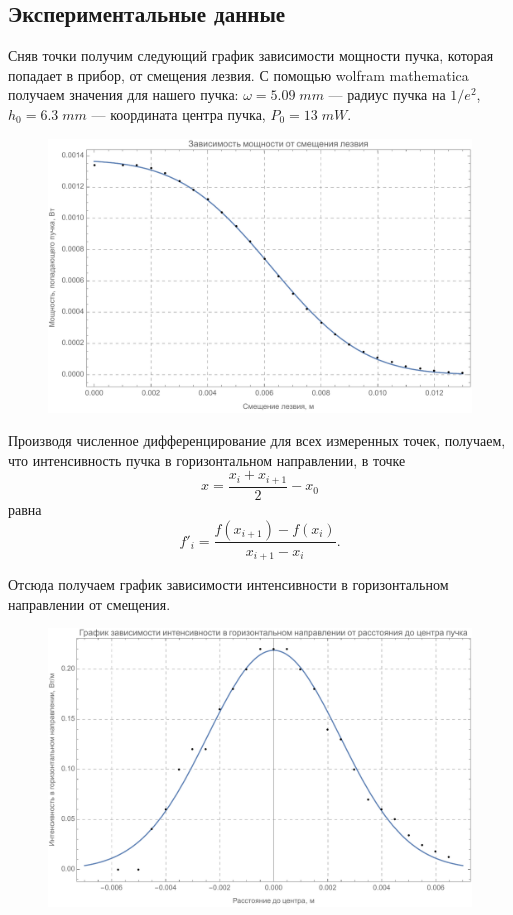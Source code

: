 \documentclass[a4paper,14pt]{extarticle}
\begin{document}
\subsection{Экспериментальные данные}
Сняв точки получим следующий график зависимости мощности пучка, которая попадает в прибор, от смещения лезвия. С помощью  wolfram mathematica получаем значения для нашего пучка: $\omega = 5.09 \; mm$ --- радиус пучка на $1/e^2$, $h_0 = 6.3 \; mm$ --- координата центра пучка, $P_0  = 13 \; mW$. 
\begin{figure}[H]
	\includegraphics[scale=0.6]{P(h)}
\end{figure}

Производя численное дифференцирование для всех измеренных точек, получаем, что интенсивность пучка в горизонтальном направлении, в точке 
$$ x = \frac{x_i + x_{i+1}}{2} - x_0$$
равна 
$$ f'_i = \frac{f(x_{i+1}) - f(x_{i})}{x_{i+1} - x_i} .$$

Отсюда получаем график зависимости интенсивности в горизонтальном направлении от смещения. 

\begin{figure}[H]
	\includegraphics[scale=0.5]{p1}
\end{figure}
\end{document}
